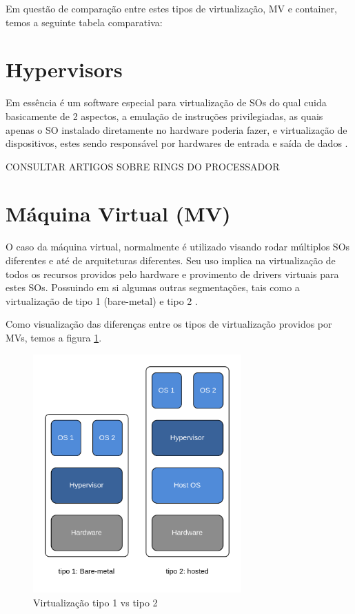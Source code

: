 Em questão de comparação entre estes tipos de virtualização, MV e container, temos a seguinte tabela comparativa:



\section{Hypervisors}
Em essência é um software especial para virtualização de SOs do qual cuida basicamente de 2 aspectos, a emulação de instruções privilegiadas, as quais apenas o SO instalado diretamente no hardware poderia fazer, e virtualização de dispositivos, estes sendo responsável por hardwares de entrada e saída de dados \cite{kernelscheepers}.

CONSULTAR ARTIGOS SOBRE RINGS DO PROCESSADOR

\section{Máquina Virtual (MV)}
\label{chp:referencial_teorico::sct:maquina_virtual}
O caso da máquina virtual, normalmente é utilizado visando rodar múltiplos SOs diferentes e até de arquiteturas diferentes. Seu uso implica na virtualização de todos os recursos providos pelo hardware e provimento de drivers virtuais para estes SOs. Possuindo em si algumas outras segmentações, tais como a virtualização de tipo 1 (bare-metal) e tipo 2 \cite{kernelscheepers, Virtualization_vs_Containerization}.

Como visualização das diferenças entre os tipos de virtualização providos por MVs, temos a figura \ref{fig:virtualization_t1_vs_t2}.

\begin{figure}
    \centering
    \includegraphics[width=8cm]{images/vm_t1_vs_t2.drawio.png}
    \caption{Virtualização tipo 1 vs tipo 2}
    \label{fig:virtualization_t1_vs_t2}
\end{figure}

